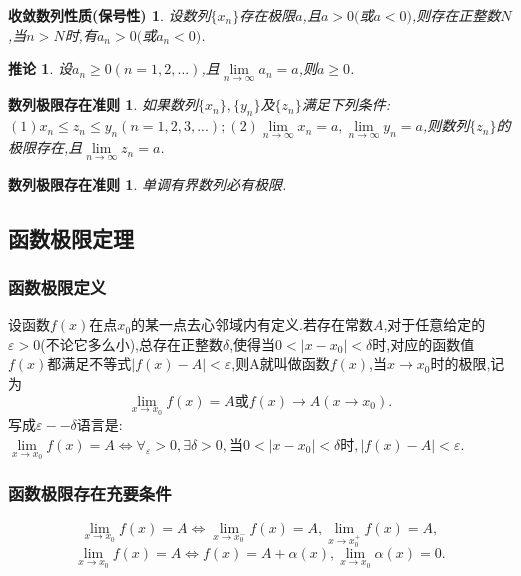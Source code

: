 \documentclass[10pt,a4paper,UTF8]{ctexart}
\begin{document}
\addtocounter{theoremcounter}{1}
\newtheorem{theorem5}{收敛数列性质(保号性)}[theoremcounter]
\begin{theorem5}
设数列$\{x_n\}$存在极限$a$,且$a>0($或$a<0)$,则存在正整数$N$,当$n>N$时,有$a_n>0($或$a_n<0)$.
\end{theorem5}

\newtheorem{theorem6}{推论}
\begin{theorem6}
设$a_n\geq 0(n=1,2,...)$,且$\lim\limits_{n\to\infty}{a_n}=a$,则$a\geq 0$.
\end{theorem6}

\setcounter{theoremcounter}{1}
\newtheorem{theorem7}{数列极限存在准则}[theoremcounter]
\begin{theorem7}
如果数列$\{x_n\},\{y_n\}$及$\{z_n\}$满足下列条件:\\
$(1)x_n\leq z_n \leq y_n(n=1,2,3,...);(2)\lim\limits_{n\to\infty}{x_n}=a,\lim\limits_{n\to\infty}{y_n}=a$,则数列$\{z_n\}$的极限存在,且$\lim\limits_{n\to\infty}{z_n}=a$.
\end{theorem7}

\addtocounter{theoremcounter}{1}
\newtheorem{theorem8}{数列极限存在准则}[theoremcounter]
\begin{theorem8}
单调有界数列必有极限.
\end{theorem8}

\subsection{函数极限定理}
\setcounter{theoremcounter}{1}
\subsubsection{函数极限定义}
设函数$f(x)$在点$x_0$的某一点去心邻域内有定义.若存在常数$A$,对于任意给定的$\varepsilon>0$(不论它多么小),总存在正整数$\delta$,使得当$0<|x-x_0|<\delta$时,对应的函数值$f(x)$都满足不等式$|f(x)-A|<\varepsilon$,则A就叫做函数$f(x)$,当$x\to x_0$时的极限,记为
\[ \lim\limits_{x\to x_0}{f(x)}=A\textit{或}f(x)\to A(x\to x_0). \]
写成$\varepsilon--\delta$语言是:$\lim\limits_{x\to x_0}{f(x)}=A\Leftrightarrow\forall_\varepsilon>0,\exists\delta>0,\textit{当}0<|x-x_0|<\delta\textit{时},|f(x)-A|<\varepsilon$.
\subsubsection{函数极限存在充要条件}
\[\lim\limits_{x\to x_0}{f(x)}=A \Leftrightarrow\lim\limits_{x\to x^{-}_0}{f(x)}=A,\lim\limits_{x\to x^{+}_0}{f(x)}=A, \]
\[\lim\limits_{x\to x_0}{f(x)}=A \Leftrightarrow f(x)=A+\alpha(x),\lim\limits_{x\to x_0}{\alpha(x)}=0.\]
\end{document}
